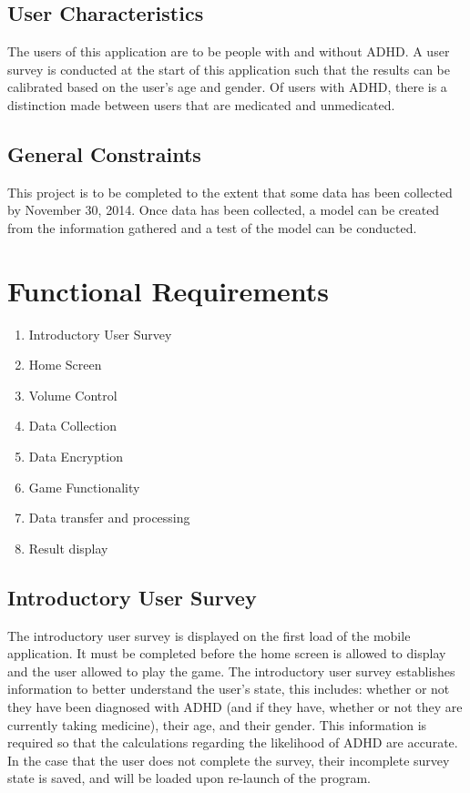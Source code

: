 \documentclass[a4wide]{article}
\begin{document}
\subsection{User Characteristics}

The users of this application are to be people with and without ADHD. A user
survey is conducted at the start of this application such that the results can
be calibrated based on the user's age and gender. Of users with ADHD, there is a
distinction made between users that are medicated and unmedicated.

\subsection{General Constraints}

This project is to be completed to the extent that some data has been collected by
November 30, 2014. Once data has been collected, a model can be created from the
information gathered and a test of the model can be conducted.


\section{Functional Requirements}

\begin{enumerate}
\item Introductory User Survey
\item Home Screen
\item Volume Control
\item Data Collection
\item Data Encryption
\item Game Functionality
\item Data transfer and processing
\item Result display
\end{enumerate}


\subsection{Introductory User Survey}
The introductory user survey is displayed on the first load of the mobile application. It must
be completed before the home screen is allowed to display and the user allowed to play the game. The introductory user
survey establishes information to better understand the user's state, this includes: whether or
not they have been diagnosed with ADHD (and if they have, whether or not they
are currently taking medicine), their age, and their gender. This information is
required so that the calculations regarding the likelihood of ADHD are accurate.
In the case that the user does not complete the survey, their incomplete
survey state is saved, and will be loaded upon re-launch of the program.
\end{document}
